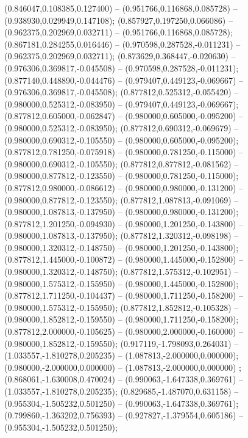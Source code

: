  (0.846047,0.108385,0.127400) -- (0.951766,0.116868,0.085728) -- (0.938930,0.029949,0.147108);
 (0.857927,0.197250,0.066086) -- (0.962375,0.202969,0.032711) -- (0.951766,0.116868,0.085728);
 (0.867181,0.284255,0.016446) -- (0.970598,0.287528,-0.011231) -- (0.962375,0.202969,0.032711);
 (0.873629,0.368447,-0.020630) -- (0.976306,0.369817,-0.045508) -- (0.970598,0.287528,-0.011231);
 (0.877140,0.448890,-0.044476) -- (0.979407,0.449123,-0.069667) -- (0.976306,0.369817,-0.045508);
 (0.877812,0.525312,-0.055420) -- (0.980000,0.525312,-0.083950) -- (0.979407,0.449123,-0.069667);
 (0.877812,0.605000,-0.062847) -- (0.980000,0.605000,-0.095200) -- (0.980000,0.525312,-0.083950);
 (0.877812,0.690312,-0.069679) -- (0.980000,0.690312,-0.105550) -- (0.980000,0.605000,-0.095200);
 (0.877812,0.781250,-0.075918) -- (0.980000,0.781250,-0.115000) -- (0.980000,0.690312,-0.105550);
 (0.877812,0.877812,-0.081562) -- (0.980000,0.877812,-0.123550) -- (0.980000,0.781250,-0.115000);
 (0.877812,0.980000,-0.086612) -- (0.980000,0.980000,-0.131200) -- (0.980000,0.877812,-0.123550);
 (0.877812,1.087813,-0.091069) -- (0.980000,1.087813,-0.137950) -- (0.980000,0.980000,-0.131200);
 (0.877812,1.201250,-0.094930) -- (0.980000,1.201250,-0.143800) -- (0.980000,1.087813,-0.137950);
 (0.877812,1.320312,-0.098198) -- (0.980000,1.320312,-0.148750) -- (0.980000,1.201250,-0.143800);
 (0.877812,1.445000,-0.100872) -- (0.980000,1.445000,-0.152800) -- (0.980000,1.320312,-0.148750);
 (0.877812,1.575312,-0.102951) -- (0.980000,1.575312,-0.155950) -- (0.980000,1.445000,-0.152800);
 (0.877812,1.711250,-0.104437) -- (0.980000,1.711250,-0.158200) -- (0.980000,1.575312,-0.155950);
 (0.877812,1.852812,-0.105328) -- (0.980000,1.852812,-0.159550) -- (0.980000,1.711250,-0.158200);
 (0.877812,2.000000,-0.105625) -- (0.980000,2.000000,-0.160000) -- (0.980000,1.852812,-0.159550);
 (0.917119,-1.798093,0.264031) -- (1.033557,-1.810278,0.205235) -- (1.087813,-2.000000,0.000000);
 (0.980000,-2.000000,0.000000) -- (1.087813,-2.000000,0.000000) ;
 (0.868061,-1.630008,0.470024) -- (0.990063,-1.647338,0.369761) -- (1.033557,-1.810278,0.205235);
 (0.829685,-1.487070,0.631158) -- (0.955304,-1.505232,0.501250) -- (0.990063,-1.647338,0.369761);
 (0.799860,-1.363202,0.756393) -- (0.927827,-1.379554,0.605186) -- (0.955304,-1.505232,0.501250);
